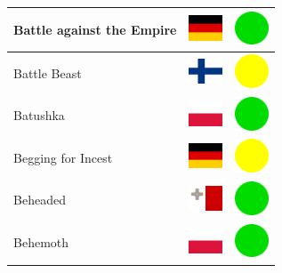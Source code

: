 \documentclass[12pt, a4paper, twoside]{report}
\begin{document}
\begin{center}
\begin{longtable}{|p{5cm}|p{2cm}|p{2cm}|}
			Battle against the Empire & \includegraphics[width=1cm]{4x3/de} & \includegraphics[width=1cm]{likes/y} \\ \hline
			Battle Beast & \includegraphics[width=1cm]{4x3/fi} & \includegraphics[width=1cm]{likes/m} \\ \hline
			Batushka & \includegraphics[width=1cm]{4x3/pl} & \includegraphics[width=1cm]{likes/y} \\ \hline
			Begging for Incest & \includegraphics[width=1cm]{4x3/de} & \includegraphics[width=1cm]{likes/m} \\ \hline
			Beheaded & \includegraphics[width=1cm]{4x3/mt} & \includegraphics[width=1cm]{likes/y} \\ \hline
			Behemoth & \includegraphics[width=1cm]{4x3/pl} & \includegraphics[width=1cm]{likes/y} \\ \hline

\end{longtable}
\end{center}
\end{document}

